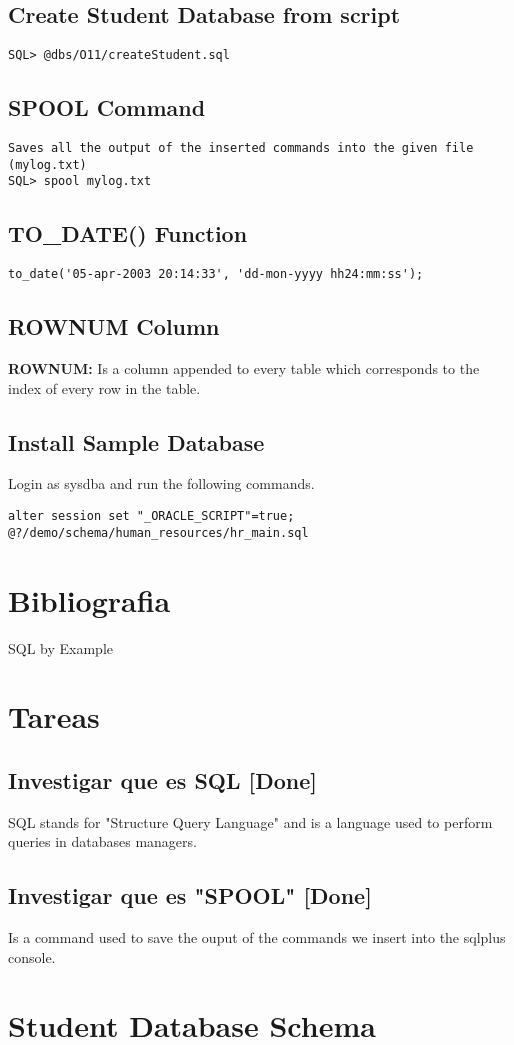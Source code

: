 \documentclass[twoside]{article}
\begin{document}
\subsection{Create Student Database from script}
\begin{verbatim}
SQL> @dbs/O11/createStudent.sql
\end{verbatim}
\subsection{SPOOL Command}
\begin{verbatim}
Saves all the output of the inserted commands into the given file (mylog.txt)
SQL> spool mylog.txt
\end{verbatim}
\subsection{TO\_DATE() Function}
\begin{verbatim}
to_date('05-apr-2003 20:14:33', 'dd-mon-yyyy hh24:mm:ss');
\end{verbatim}

\subsection{ROWNUM Column}
\textbf{ROWNUM: } Is a column appended to every table which corresponds to the index of every row in the table.
\subsection{Install Sample Database}
Login as sysdba and run the following commands.
\begin{verbatim}
alter session set "_ORACLE_SCRIPT"=true;
@?/demo/schema/human_resources/hr_main.sql
\end{verbatim}
\section{Bibliografia}

SQL by Example

\section{Tareas}
\subsection{Investigar que es SQL [Done]}
SQL stands for "Structure Query Language" and is a language used to perform queries in databases managers.
\subsection{Investigar que es "SPOOL" [Done]}
Is a command used to save the ouput of the commands we insert into the sqlplus console.
\section{Student Database Schema}

\end{document}
